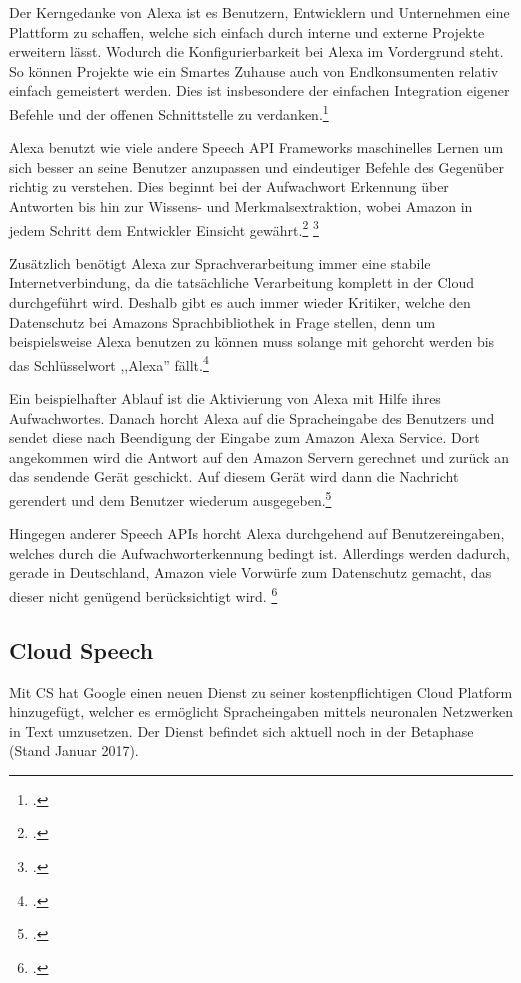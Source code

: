 Der Kerngedanke von Alexa ist es Benutzern, Entwicklern und Unternehmen eine Plattform zu schaffen, welche sich einfach durch interne und externe Projekte erweitern lässt. Wodurch die Konfigurierbarkeit bei Alexa im Vordergrund steht. So können Projekte wie ein Smartes Zuhause auch von Endkonsumenten relativ einfach gemeistert werden. Dies ist insbesondere der einfachen Integration eigener Befehle und der offenen Schnittstelle zu verdanken.\footcite[vgl.:][]{alexaDev}

Alexa benutzt wie viele andere Speech \ac{API} Frameworks maschinelles Lernen um sich besser an seine Benutzer anzupassen und eindeutiger Befehle des Gegenüber richtig zu verstehen. Dies beginnt bei der Aufwachwort Erkennung über Antworten bis hin zur Wissens- und Merkmalsextraktion, wobei Amazon in jedem Schritt dem Entwickler Einsicht gewährt.\footcite[vgl.:][]{alexaHow} \footcite[vgl.:][]{alexaDev}

Zusätzlich benötigt Alexa zur Sprachverarbeitung immer eine stabile Internetverbindung, da die tatsächliche Verarbeitung komplett in der Cloud durchgeführt wird. Deshalb gibt es auch immer wieder Kritiker, welche den Datenschutz bei Amazons Sprachbibliothek in Frage stellen, denn um beispielsweise Alexa benutzen zu können muss solange mit gehorcht werden bis das Schlüsselwort ,,Alexa'' fällt.\footcite[vgl.:][]{alexaHow}

Ein beispielhafter Ablauf ist die Aktivierung von Alexa mit Hilfe ihres Aufwachwortes. Danach horcht Alexa auf die Spracheingabe des Benutzers und sendet diese nach Beendigung der Eingabe zum Amazon Alexa Service. Dort angekommen wird die Antwort auf den Amazon Servern gerechnet und zurück an das sendende Gerät geschickt. Auf diesem Gerät wird dann die Nachricht gerendert und dem Benutzer wiederum ausgegeben.\footcite[vgl.:][]{alexaExplained}

Hingegen anderer Speech \ac{API}s horcht Alexa durchgehend auf Benutzereingaben, welches durch die Aufwachworterkennung bedingt ist. Allerdings werden dadurch, gerade in Deutschland, Amazon viele Vorwürfe zum Datenschutz gemacht, das dieser nicht genügend berücksichtigt wird. \footcite[vgl.:][]{alexaDatenschutz}

\subsection{Cloud Speech}
Mit \ac{CS} hat Google einen neuen Dienst zu seiner kostenpflichtigen Cloud Platform hinzugefügt, welcher es ermöglicht Spracheingaben mittels neuronalen Netzwerken in Text umzusetzen. Der Dienst befindet sich aktuell noch in der Betaphase (Stand Januar 2017).

